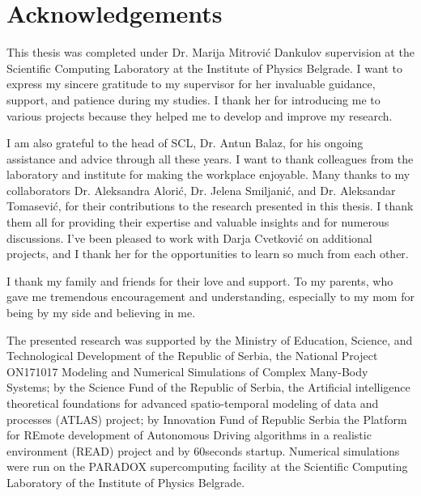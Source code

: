 
\normalsize
\chapter{Acknowledgements}

This thesis was completed under Dr. Marija Mitrović Dankulov supervision at the Scientific Computing Laboratory at the Institute of Physics Belgrade. I want to express my sincere gratitude to my supervisor for her invaluable guidance, support, and patience during my studies. I thank her for introducing me to various projects because they helped me to develop and improve my research. 

I am also grateful to the head of SCL, Dr. Antun Balaz, for his ongoing assistance and advice through all these years. I want to thank colleagues from the laboratory and institute for making the workplace enjoyable. Many thanks to my collaborators Dr. Aleksandra Alorić, Dr. Jelena Smiljanić, and Dr. Aleksandar Tomasević, for their contributions to the research presented in this thesis. I thank them all for providing their expertise and valuable insights and for numerous discussions. I've been pleased to work with Darja Cvetković on additional projects, and I thank her for the opportunities to learn so much from each other.

I thank my family and friends for their love and support. To my parents, who gave me tremendous encouragement and understanding, especially to my mom for being by my side and believing in me.

The presented research was supported by the Ministry of Education, Science, and Technological Development of the Republic of Serbia, the National Project ON171017 Modeling and Numerical Simulations of Complex Many-Body Systems; by the Science Fund of the Republic of Serbia, the Artificial intelligence theoretical foundations for advanced spatio-temporal modeling of data and processes (ATLAS) project; by Innovation Fund of Republic Serbia the Platform for REmote development of Autonomous Driving algorithms in a realistic environment (READ) project and by 60seconds startup. Numerical simulations were run on the PARADOX supercomputing facility at the Scientific Computing Laboratory of the Institute of Physics Belgrade.

\hfill

\justify
